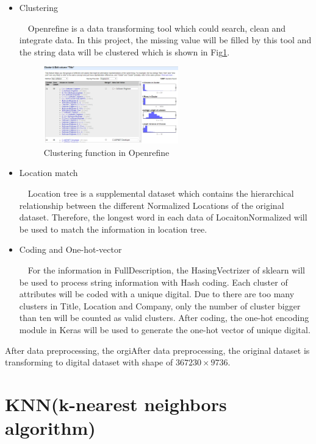 \documentclass[12pt,journal,nofonttune]{IEEEtran}
\begin{document}
\begin{itemize}
\item Clustering

\ \ Openrefine is a data transforming tool which could search, clean and integrate data\cite{verborgh2013using}. In this project, the missing value will be filled by this tool and the string data will be clustered which is shown in Fig\ref{cluster}.

\begin{figure}[htbp]
    \centering
    \includegraphics[width=0.55\textwidth]{cleaning_step1.png}
    \caption{\label{cluster}Clustering function in Openrefine}
\end{figure}

\item Location match

\ \ Location tree is a supplemental dataset which contains the hierarchical relationship between the different Normalized Locations of the original dataset. Therefore, the longest word in each data of LocaitonNormalized will be used to match the information in location tree.

\item Coding and One-hot-vector

\ \ For the information in FullDescription, the HasingVectrizer of sklearn will be used to process string information with Hash coding.
Each cluster of attributes will be coded with a unique digital. Due to there are too many clusters in Title, Location and Company, only the number of cluster bigger than ten will be counted as valid clusters. 
After coding, the one-hot encoding module in Keras will be used to generate the one-hot vector of unique digital.
\end{itemize}

After data preprocessing, the orgiAfter data preprocessing, the original dataset is transforming to digital dataset with shape of $367230\times9736$.

\section{KNN(k-nearest neighbors algorithm)}
\end{document}
